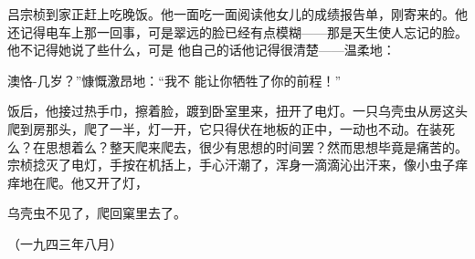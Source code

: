 \documentclass{article}
\begin{document}
    吕宗桢到家正赶上吃晚饭。他一面吃一面阅读他女儿的成绩报告单，刚寄来的。他还记得电车上那一回事，可是翠远的脸已经有点模糊——那是天生使人忘记的脸。他不记得她说了些什么，可是
他自己的话他记得很清楚——温柔地： 

    澳恪-几岁？”慷慨激昂地：“我不
能让你牺牲了你的前程！” 

    饭后，他接过热手巾，擦着脸，踱到卧室里来，扭开了电灯。一只乌壳虫从房这头爬到房那头，爬了一半，灯一开，它只得伏在地板的正中，一动也不动。在装死么？在思想着么？整天爬来爬去，很少有思想的时间罢？然而思想毕竟是痛苦的。宗桢捻灭了电灯，手按在机括上，手心汗潮了，浑身一滴滴沁出汗来，像小虫子痒痒地在爬。他又开了灯，

\newpage
乌壳虫不见了，爬回窠里去了。 

    （一九四三年八月）
\end{document}
